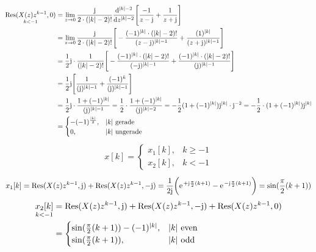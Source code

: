 \begin{align}
	\underset{k<-1}{\mathrm{Res}(X(z)z^{k-1},0)}&=\lim\limits_{z\rightarrow0}\frac{\im}{2\cdot(|k|-2)!}\frac{\mathrm{d}^{|k|-2}}{\mathrm{d}z^{|k|-2}}\Bigg [\frac{-1}{z-\im}+\frac{1}{z+\im} \Bigg ] \nonumber \\
	&=\lim\limits_{z\rightarrow0}\frac{\im}{2\cdot(|k|-2)!}\Bigg [-\frac{(-1)^{|k|}\cdot(|k|-2)!}{(z-\im)^{|k|-1}}+\frac{(1)^{|k|}}{(z+\im)^{|k|-1}} \Bigg]\nonumber\\
	&=\frac{1}{2}\im \cdot\frac{1}{(|k|-2)!}\Bigg [-\frac{(-1)^{|k|}\cdot(|k|-2)!}{(-\im)^{|k|-1}}+\frac{(-1)^{|k|}\cdot(|k|-2)!}{(\im)^{|k|-1}}\Bigg] \nonumber \\
	&=\frac{1}{2}\im\Bigg[\frac{1}{(\im)^{|k|-1}}+\frac{(-1)^{k}}{(\im)^{|k|-1}}\Bigg ] \nonumber \\
	&=\frac{1}{2}\im\cdot\frac{1+(-1)^{|k|}}{(\im)^{|k|-1}}=\frac{1}{2}\cdot\frac{1+(-1)^{|k|}}{(\im)^{|k|-2}}=-\frac{1}{2}(1+(-1)^{|k|})\im^{|k|}\cdot\im^{-2}=-\frac{1}{2}\cdot(1+(-1)^{|k|})\im^{|k|} \nonumber \\
	&=\begin{cases}
		-(-1)^{\frac{|k|}{2}}, &|k|\text{ gerade} \\
		0, &|k|\text{ ungerade}
	\end{cases}
\end{align}
\begin{align}
	x[k]=\begin{cases}
		x_1[k], &k\geq -1 \\
		x_2[k], &k< -1
	\end{cases}
\end{align}
\begin{align}
	x_1[k]=\mathrm{Res}(X(z)z^{k-1},\im)+\mathrm{Res}(X(z)z^{k-1},-\im)=\frac{1}{2\im}\bigg(\e^{+\im\frac{\pi}{2}(k+1)}-\e^{-\im\frac{\pi}{2}(k+1)}\bigg )=\sin(\frac{\pi}{2}(k+1))
\end{align}
\begin{align}
	\underset{k<-1}{x_2[k]}&=\mathrm{Res}(X(z)z^{k-1},\im)+\mathrm{Res}(X(z)z^{k-1},-\im)+\mathrm{Res}(X(z)z^{k-1},0) \nonumber \\
	&=\begin{cases}
		\sin(\frac{\pi}{2}(k+1))-(-1)^{|k|}, &|k| \text{ even} \\
		\sin(\frac{\pi}{2}(k+1)), &|k| \text{ odd}
	\end{cases}
\end{align}

